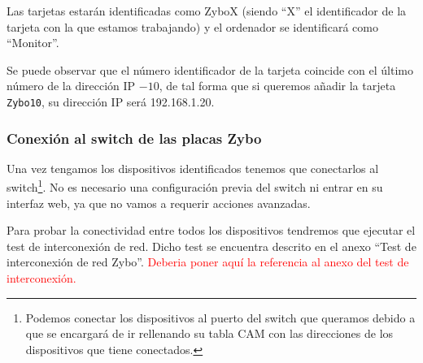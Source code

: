 \begin{itemize}
	Las tarjetas estarán identificadas como ZyboX (siendo ``X'' el identificador de la tarjeta con la que estamos trabajando) y el ordenador se identificará como ``Monitor''.
	
	Se puede observar que el número identificador de la tarjeta coincide con el último número de la dirección IP $- 10$, de tal forma que si queremos añadir la tarjeta \texttt{Zybo10}, su dirección IP será 192.168.1.20.
\end{itemize}


\subsubsection{Conexión al switch de las placas Zybo}
Una vez tengamos los dispositivos identificados tenemos que conectarlos al switch\footnote{Podemos conectar los dispositivos al puerto del switch que queramos debido a que se encargará de ir rellenando su tabla CAM con las direcciones de los dispositivos que tiene conectados.}. No es necesario una configuración previa del switch ni entrar en su interfaz web, ya que no vamos a requerir acciones avanzadas.

Para probar la conectividad entre todos los dispositivos tendremos que ejecutar el test de interconexión de red. Dicho test se encuentra descrito en el anexo ``Test de interconexión de red Zybo''. \textcolor{red}{Deberia poner aquí la referencia al anexo del test de interconexión.}